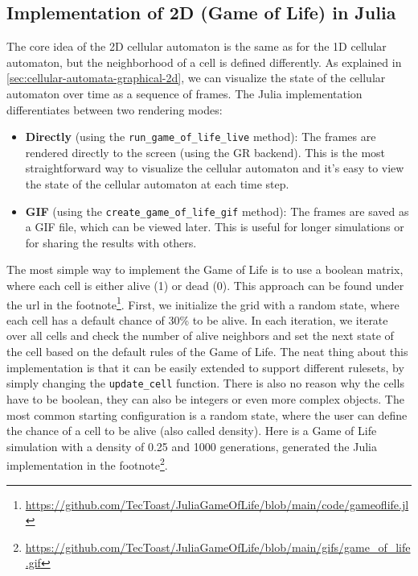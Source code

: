 \documentclass[a4paper,12pt]{llncs}
\numberwithin{equation}{section}
\begin{document}
\subsection{Implementation of 2D (Game of Life) in Julia}
The core idea of the 2D cellular automaton is the same as for the 1D cellular automaton, but the neighborhood of a cell is defined differently.
As explained in \autoref{sec:cellular-automata-graphical-2d}, we can visualize the state of the cellular automaton over time as a sequence of frames.
The Julia implementation differentiates between two rendering modes:
\begin{itemize}
  \item \textbf{Directly} (using the \texttt{run\_game\_of\_life\_live} method): The frames are rendered directly to the screen (using the GR backend). This is the most straightforward way to visualize the cellular automaton and it's easy to view the state of the cellular automaton at each time step.
  \item \textbf{GIF} (using the \texttt{create\_game\_of\_life\_gif} method): The frames are saved as a GIF file, which can be viewed later. This is useful for longer simulations or for sharing the results with others.
\end{itemize}
The most simple way to implement the Game of Life is to use a boolean matrix, where each cell is either alive (1) or dead (0).
This approach can be found under the url in the footnote\footnote{\url{https://github.com/TecToast/JuliaGameOfLife/blob/main/code/gameoflife.jl}}.
First, we initialize the grid with a random state, where each cell has a default chance of 30\% to be alive.
In each iteration, we iterate over all cells and check the number of alive neighbors and set the next state of the cell based on the default rules of the Game of Life.
The neat thing about this implementation is that it can be easily extended to support different rulesets, by simply changing the \texttt{update\_cell} function.
There is also no reason why the cells have to be boolean, they can also be integers or even more complex objects.
The most common starting configuration is a random state, where the user can define the chance of a cell to be alive (also called density).
Here is a Game of Life simulation with a density of 0.25 and 1000 generations, generated the Julia implementation in the footnote\footnote{\url{https://github.com/TecToast/JuliaGameOfLife/blob/main/gifs/game_of_life.gif}}.
\end{document}
